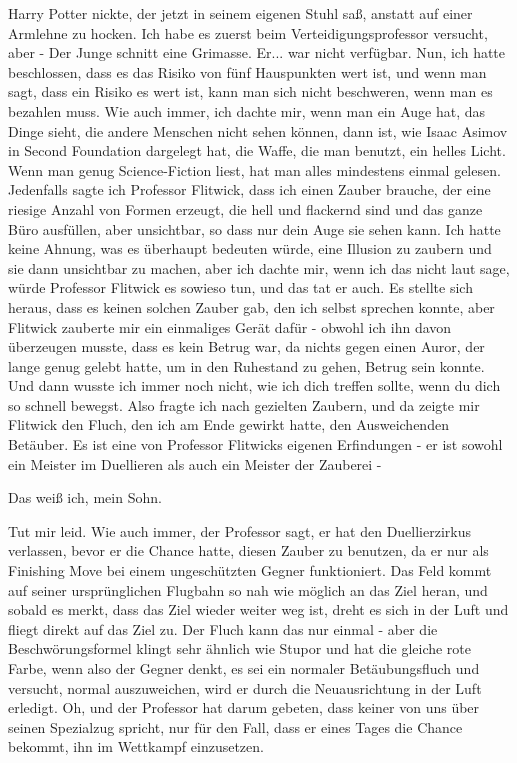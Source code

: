 Harry Potter nickte, der jetzt in seinem eigenen Stuhl saß, anstatt auf einer
Armlehne zu hocken. \glqq{}Ich habe es zuerst beim Verteidigungsprofessor
versucht, aber -\grqq{} Der Junge schnitt eine Grimasse. \glqq{}Er... war nicht
verfügbar. Nun, ich hatte beschlossen, dass es das Risiko von fünf Hauspunkten
wert ist, und wenn man sagt, dass ein Risiko es wert ist, kann man sich nicht
beschweren, wenn man es bezahlen muss. Wie auch immer, ich dachte mir, wenn man
ein Auge hat, das Dinge sieht, die andere Menschen nicht sehen können, dann ist,
wie Isaac Asimov in \glqq{}Second Foundation\grqq{} dargelegt hat, die Waffe, die
man benutzt, ein helles Licht. Wenn man genug Science-Fiction liest, hat man
alles mindestens einmal gelesen. Jedenfalls sagte ich Professor Flitwick, dass
ich einen Zauber brauche, der eine riesige Anzahl von Formen erzeugt, die hell
und flackernd sind und das ganze Büro ausfüllen, aber unsichtbar, so dass nur
dein Auge sie sehen kann. Ich hatte keine Ahnung, was es überhaupt bedeuten
würde, eine Illusion zu zaubern und sie dann unsichtbar zu machen, aber ich
dachte mir, wenn ich das nicht laut sage, würde Professor Flitwick es sowieso
tun, und das tat er auch. Es stellte sich heraus, dass es keinen solchen Zauber
gab, den ich selbst sprechen konnte, aber Flitwick zauberte mir ein einmaliges
Gerät dafür - obwohl ich ihn davon überzeugen musste, dass es kein Betrug war,
da nichts gegen einen Auror, der lange genug gelebt hatte, um in den Ruhestand
zu gehen, Betrug sein konnte. Und dann wusste ich immer noch nicht, wie ich dich
treffen sollte, wenn du dich so schnell bewegst. Also fragte ich nach gezielten
Zaubern, und da zeigte mir Flitwick den Fluch, den ich am Ende gewirkt hatte,
den \glqq{}Ausweichenden Betäuber\grqq{}. Es ist eine von Professor Flitwicks
eigenen Erfindungen - er ist sowohl ein Meister im Duellieren als auch ein
Meister der Zauberei -\grqq{}

\glqq{}Das weiß ich, mein Sohn.\grqq{}

\glqq{}Tut mir leid. Wie auch immer, der Professor sagt, er hat den
Duellierzirkus verlassen, bevor er die Chance hatte, diesen Zauber zu benutzen,
da er nur als Finishing Move bei einem ungeschützten Gegner funktioniert. Das
Feld kommt auf seiner ursprünglichen Flugbahn so nah wie möglich an das Ziel
heran, und sobald es merkt, dass das Ziel wieder weiter weg ist, dreht es sich
in der Luft und fliegt direkt auf das Ziel zu. Der Fluch kann das nur einmal -
aber die Beschwörungsformel klingt sehr ähnlich wie \glqq{}Stupor\grqq{} und hat
die gleiche rote Farbe, wenn also der Gegner denkt, es sei ein normaler
Betäubungsfluch und versucht, normal auszuweichen, wird er durch die
Neuausrichtung in der Luft erledigt. Oh, und der Professor hat darum gebeten,
dass keiner von uns über seinen Spezialzug spricht, nur für den Fall, dass er
eines Tages die Chance bekommt, ihn im Wettkampf einzusetzen.\grqq{}


